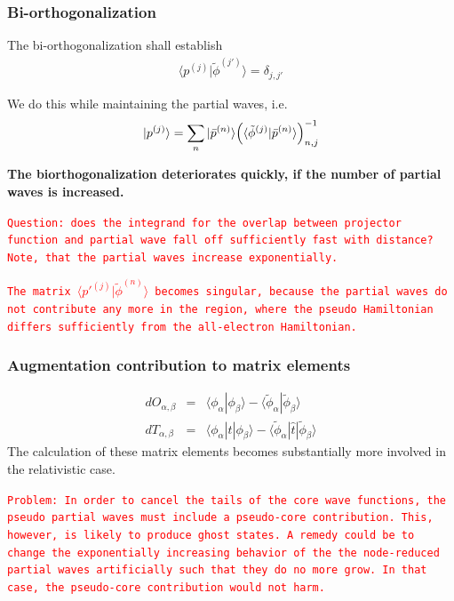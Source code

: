 \documentclass[11pt,a4paper]{report}
\newcommand{\petertt}[1]{\textcolor{red}{\texttt{#1}}}
\begin{document}
\subsubsection{Bi-orthogonalization}
The bi-orthogonalization shall establish 
\begin{eqnarray}
\langle p^{(j)}|\tilde{\phi}^{(j')}\rangle=\delta_{j,j'}
\end{eqnarray}

We do this while maintaining the partial waves, i.e.
\begin{eqnarray}
|p^{(j)}\rangle=\sum_{n}|\bar{p}^{(n)}\rangle
\Bigl(\langle\tilde{\phi}^{(j)}|\bar{p}^{(n)}\rangle\Bigr)^{-1}_{n,j}
\end{eqnarray}

\textbf{The biorthogonalization deteriorates quickly, if the number of
  partial waves is increased.}

\petertt{Question: does the integrand for the overlap between
  projector function and partial wave fall off sufficiently fast with
  distance? Note, that the partial waves increase exponentially.}

\petertt{The matrix $\langle p'^{(j)}|\tilde{\phi}^{(n)}\rangle$
  becomes singular, because the partial waves do not contribute any
  more in the region, where the pseudo Hamiltonian differs
  sufficiently from the all-electron Hamiltonian.}


\subsubsection{Augmentation contribution to matrix elements}
\begin{eqnarray}
dO_{\alpha,\beta}&=&\langle\phi_\alpha|\phi_\beta\rangle-
\langle\tilde{\phi}_\alpha|\tilde{\phi}_\beta\rangle
\nonumber\\
dT_{\alpha,\beta}&=&\langle\phi_\alpha|\hat{t}|\phi_\beta\rangle-
\langle\tilde{\phi}_\alpha|\hat{t}|\tilde{\phi}_\beta\rangle
\end{eqnarray}
The calculation of these matrix elements becomes substantially more
involved in the relativistic case.

\petertt{Problem: In order to cancel the tails of the core wave
  functions, the pseudo partial waves must include a pseudo-core
  contribution. This, however, is likely to produce ghost states. A
  remedy could be to change the exponentially increasing behavior of
  the the node-reduced partial waves artificially such that they do no
  more grow. In that case, the pseudo-core contribution would not harm.}
\end{document}
